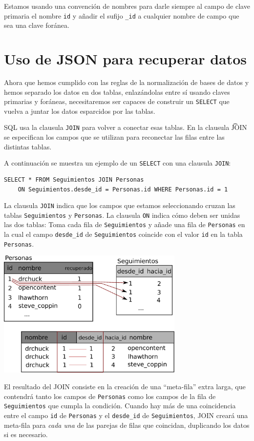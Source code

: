 Estamos usando una
convención de nombres para darle siempre al campo de clave primaria el nombre
{\tt id} y añadir el sufijo \verb"_id" a cualquier nombre de campo
que sea una clave foránea.

\section{Uso de JSON para recuperar datos}

Ahora que hemos cumplido con las reglas de la normalización de bases de datos
y hemos separado los datos en dos tablas, enlazándolas entre sí usando
claves primarias y foráneas, necesitaremos ser capaces de construir un
{\tt SELECT} que vuelva a juntar los datos esparcidos por las tablas.

SQL usa la clausula {\tt JOIN} para volver a conectar esas tablas.
En la clausula {\t JOIN} se especifican los campos que se utilizan
para reconectar las filas entre las distintas tablas.

A continuación se muestra un ejemplo de un {\tt SELECT} con una
clausula {\tt JOIN}:

\beforeverb
\begin{verbatim}
SELECT * FROM Seguimientos JOIN Personas 
    ON Seguimientos.desde_id = Personas.id WHERE Personas.id = 1
\end{verbatim}
\afterverb
%
La clausula {\tt JOIN} indica que los campos que estamos seleccionando
cruzan las tablas {\tt Seguimientos} y {\tt Personas}. La clausula
{\tt ON} indica cómo deben ser unidas las dos tablas: Toma cada fila
de {\tt Seguimientos} y añade una fila de {\tt Personas} en la cual el
campo \verb"desde_id" de {\tt Seguimientos} coincide con el valor {\tt id}
en la tabla {\tt Personas}.

\beforefig
\centerline{\includegraphics[height=2.50in]{figs2/join.eps}}
\afterfig

El resultado del JOIN consiste en la creación de una ``meta-fila'' extra larga, que contendrá
tanto los campos de {\tt Personas} como los campos de la fila de {\tt Seguimientos} que cumpla la
condición.
Cuando hay más de una coincidencia entre el campo {\tt id} de {\tt Personas}
y el \verb"desde_id" de {\tt Seguimientos}, JOIN creará una meta-fila
para \emph{cada una} de las parejas de filas que coincidan, duplicando los datos si es necesario.

